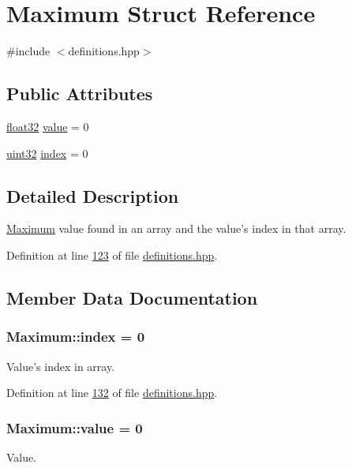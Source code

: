 \hypertarget{structMaximum}{\section{Maximum Struct Reference}
\label{structMaximum}
}


{\ttfamily \#include $<$definitions.\+hpp$>$}

\subsection*{Public Attributes}
\begin{DoxyCompactItemize}
\item 
\hyperlink{definitions_8hpp_aacdc525d6f7bddb3ae95d5c311bd06a1}{float32} \hyperlink{structMaximum_aa7e84cbf37b694670142670014366969}{value} = 0
\item 
\hyperlink{definitions_8hpp_a1134b580f8da4de94ca6b1de4d37975e}{uint32} \hyperlink{structMaximum_a2e6aef03795cd285fe542d0861c6e3b5}{index} = 0
\end{DoxyCompactItemize}


\subsection{Detailed Description}
\hyperlink{structMaximum}{Maximum} value found in an array and the value's index in that array. 

Definition at line \hyperlink{definitions_8hpp_source_l00123}{123} of file \hyperlink{definitions_8hpp_source}{definitions.\+hpp}.



\subsection{Member Data Documentation}
\hypertarget{structMaximum_a2e6aef03795cd285fe542d0861c6e3b5}{
\subsubsection[{index}]{ Maximum\+::index = 0}}\label{structMaximum_a2e6aef03795cd285fe542d0861c6e3b5}
Value's index in array. 

Definition at line \hyperlink{definitions_8hpp_source_l00132}{132} of file \hyperlink{definitions_8hpp_source}{definitions.\+hpp}.

\hypertarget{structMaximum_aa7e84cbf37b694670142670014366969}{
\subsubsection[{value}]{ Maximum\+::value = 0}}\label{structMaximum_aa7e84cbf37b694670142670014366969}
Value. 

